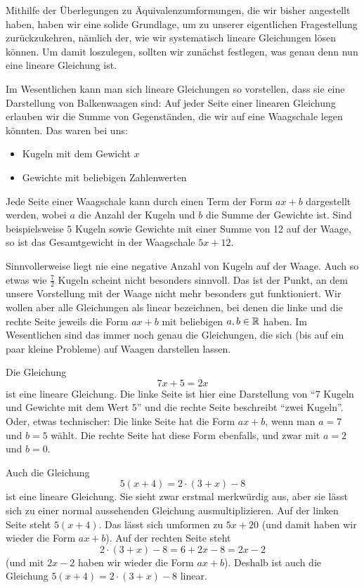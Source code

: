 \documentclass[../../main.tex]{subfiles}
\begin{document}
Mithilfe der Überlegungen zu Äquivalenzumformungen, die wir bisher angestellt haben, haben wir eine solide Grundlage, um zu unserer eigentlichen Fragestellung zurückzukehren, nämlich der, wie wir systematisch lineare Gleichungen lösen können. Um damit loszulegen, sollten wir zunächst festlegen, was genau denn nun eine lineare Gleichung ist.

Im Wesentlichen kann man sich lineare Gleichungen so vorstellen, dass sie eine Darstellung von Balkenwaagen sind: Auf jeder Seite einer linearen Gleichung erlauben wir die Summe von Gegenständen, die wir auf eine Waagschale legen könnten. Das waren bei uns:
\begin{itemize}
    \item Kugeln mit dem Gewicht $x$
    \item Gewichte mit beliebigen Zahlenwerten
\end{itemize}

Jede Seite einer Waagschale kann durch einen Term der Form $ax+b$ dargestellt werden, wobei $a$ die Anzahl der Kugeln und $b$ die Summe der Gewichte ist. Sind beispielsweise $5$ Kugeln sowie Gewichte mit einer Summe von 12 auf der Waage, so ist das Gesamtgewicht in der Waagschale $5x+12$.

Sinnvollerweise liegt nie eine negative Anzahl von Kugeln auf der Waage. Auch so etwas wie $\frac{7}{2}$ Kugeln scheint nicht besonders sinnvoll. Das ist der Punkt, an dem unsere Vorstellung mit der Waage nicht mehr besonders gut funktioniert. Wir wollen aber alle Gleichungen als linear bezeichnen, bei denen die linke und die rechte Seite jeweils die Form $ax+b$ mit beliebigen $a,b\in\mathbb{R}$ haben. Im Wesentlichen sind das immer noch genau die Gleichungen, die sich (bis auf ein paar kleine Probleme) auf Waagen darstellen lassen.

\begin{example}{}
    Die Gleichung 
    \[7x+5=2x\] 
    ist eine lineare Gleichung. Die linke Seite ist hier eine Darstellung von \enquote{7 Kugeln und Gewichte mit dem Wert 5} und die rechte Seite beschreibt \enquote{zwei Kugeln}. Oder, etwas technischer: Die linke Seite hat die Form $ax+b$, wenn man $a=7$ und $b=5$ wählt. Die rechte Seite hat diese Form ebenfalls, und zwar mit $a=2$ und $b=0$.
\end{example}
\begin{example}{}
    Auch die Gleichung 
    \[5(x+4)=2\cdot (3+x)-8\] 
    ist eine lineare Gleichung. Sie sieht zwar erstmal merkwürdig aus, aber sie lässt sich zu einer normal aussehenden Gleichung ausmultiplizieren. Auf der linken Seite steht $5(x+4)$. Das lässt sich umformen zu $5x+20$ (und damit haben wir wieder die Form $ax+b$). Auf der rechten Seite steht 
    \[2\cdot (3+x)-8=6+2x-8=2x-2\] 
    (und mit $2x-2$ haben wir wieder die Form $ax+b$). Deshalb ist auch die Gleichung $5(x+4)=2\cdot (3+x)-8$ linear.
\end{example}
\end{document}
